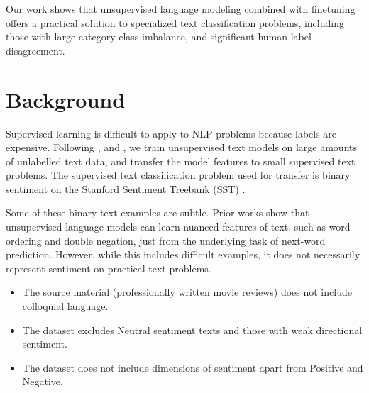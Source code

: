 \documentclass[letterpaper]{article} %
\begin{document}
Our work shows that unsupervised language modeling combined with finetuning offers a practical solution to specialized text classification problems, including those with large category class imbalance, and significant human label disagreement.



\section{Background}
Supervised learning is difficult to apply to NLP problems because labels are expensive. Following \protect\cite{Radford2017}, \protect\cite{Radford2018} and \protect\cite{Dai2015}, we train unsupervised text models on large amounts of unlabelled text data, and transfer the model features to small supervised text problems. The supervised text classification problem used for transfer is binary sentiment on the Stanford Sentiment Treebank (SST) \protect\cite{SST-Socher:2013}.


Some of these binary text examples are subtle. Prior works show that unsupervised language models can learn nuanced features of text, such as word ordering and double negation, just from the underlying task of next-word prediction. However, while this includes difficult examples, it does not necessarily represent sentiment on practical text problems.
\begin{itemize}
\itemsep0em
    \item The source material (professionally written movie reviews) does not include colloquial language.
    \item The dataset excludes Neutral sentiment texts and those with weak directional sentiment.
    \item The dataset does not include dimensions of sentiment apart from Positive and Negative.
\end{itemize}
\end{document}
